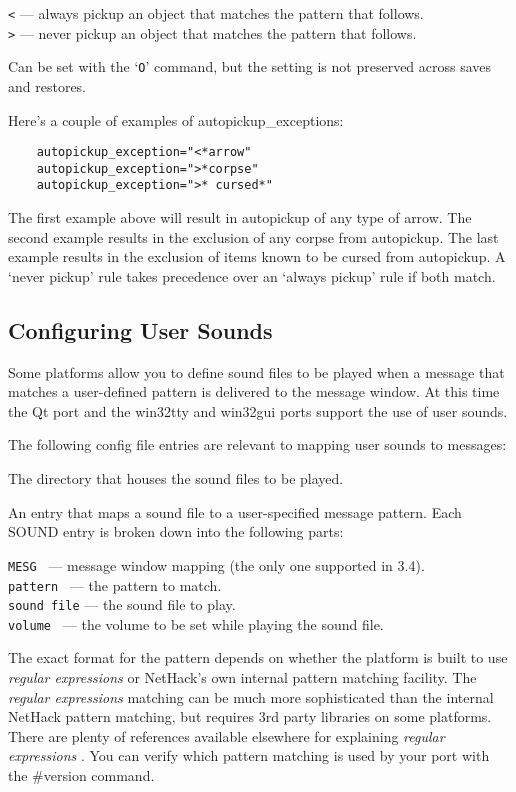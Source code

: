 {\tt <} --- always pickup an object that matches the pattern that follows.\\
{\tt >} --- never pickup an object that matches the pattern that follows.

Can be set with the `{\tt O}' command, but the setting is not preserved
across saves and restores.
\elist

Here's a couple of examples of autopickup\_exceptions:
\begin{verbatim}
    autopickup_exception="<*arrow"
    autopickup_exception=">*corpse"
    autopickup_exception=">* cursed*"
\end{verbatim}

The first example above will result in autopickup of any type of arrow.
The second example results in the exclusion of any corpse from autopickup.
The last example results in the exclusion of items known to be cursed from autopickup.
A `never pickup' rule takes precedence over an `always pickup' rule if both match.

\subsection*{Configuring User Sounds}

Some platforms allow you to define sound files to be played when a message 
that matches a user-defined pattern is delivered to the message window.
At this time the Qt port and the win32tty and win32gui ports support the
use of user sounds.

The following config file entries are relevant to mapping user sounds
to messages:

\blist{}
\item[\ib{SOUNDDIR}]
The directory that houses the sound files to be played.
\item[\ib{SOUND}]
An entry that maps a sound file to a user-specified message pattern.
Each SOUND entry is broken down into the following parts:

{\tt MESG      } --- message window mapping (the only one supported in 3.4).\\
{\tt pattern   } --- the pattern to match.\\
{\tt sound file} --- the sound file to play.\\
{\tt volume    } --- the volume to be set while playing the sound file.
\elist

The exact format for the pattern depends on whether the platform is
built to use {\it regular expressions \/} or NetHack's own internal pattern 
matching facility. The {\it regular expressions \/} matching can be much more 
sophisticated than the internal NetHack pattern matching, but requires 
3rd party libraries on some platforms.  There are plenty of references 
available elsewhere for explaining {\it regular expressions \/}. You can verify 
which pattern matching is used by your port with the 
\#version command.  


